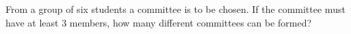 From a group of six students a committee is to be chosen. If the committee must have at least $3$ members, how many different committees can be formed?
